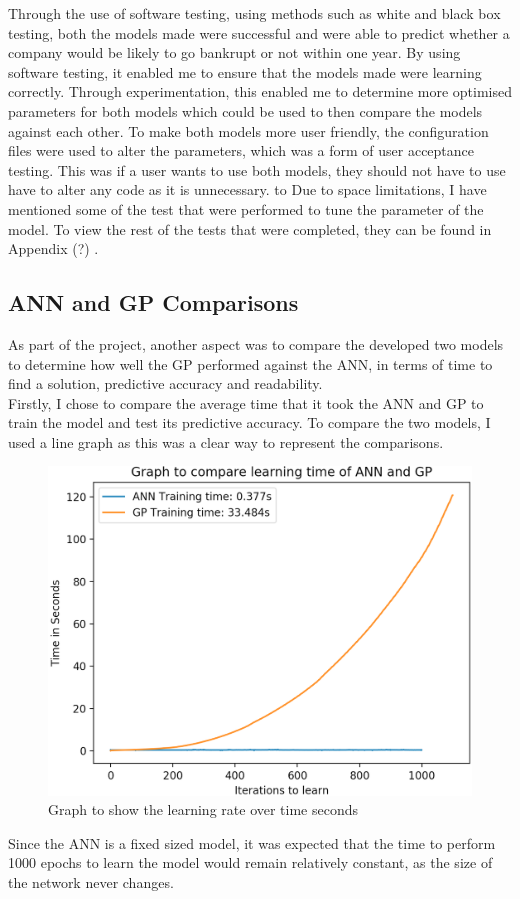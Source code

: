 \documentclass[11pt]{article}
\begin{document}
Through the use of software testing, using methods such as white and black box testing, both the models made were successful and were able to predict whether a company would be likely to go bankrupt or not within one year. By using software testing, it enabled me to ensure that the models made were learning correctly. Through experimentation, this enabled me to determine more optimised parameters for both models which could be used to then compare the models against each other. To make both models more user friendly, the configuration files were used to alter the parameters, which was a form of user acceptance testing. This was if a user wants to use both models, they should not have to use have to alter any code as it is unnecessary. to Due to space limitations, I have mentioned some of the test that were performed to tune the parameter of the model. To view the rest of the tests that were completed, they can be found in Appendix (?) .
\subsection{ANN and GP Comparisons}\label{subsec:ANNGPC}
As part of the project, another aspect was to compare the developed two models to determine how well the GP performed against the ANN, in terms of time to find a solution, predictive accuracy and readability. \\

Firstly, I chose to compare the average time that it took the ANN and GP to train the model and test its predictive accuracy. To compare the two models, I used a line graph as this was a clear way to represent the comparisons.


\begin{figure}[h]
\centering
\includegraphics[scale = .45]{learning_rates}
\caption{Graph to show the learning rate over time seconds} 
\end{figure}
Since the ANN is a fixed sized model, it was expected that the time to perform 1000 epochs to learn the model would remain relatively constant, as the size of the network never changes. 
\end{document}
